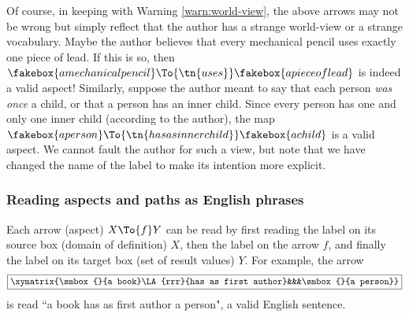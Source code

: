 Of course, in keeping with Warning \ref{warn:world-view}, the above arrows may not be wrong but simply reflect that the author has a strange world-view or a strange vocabulary. Maybe the author believes that every mechanical pencil uses exactly one piece of lead. If this is so, then $\fakebox{a mechanical pencil}\To{\tn{uses}}\fakebox{a piece of lead}$ is indeed a valid aspect!   Similarly, suppose the author meant to say that each person {\em was once} a child, or that a person has an inner child. Since every person has one and only one inner child (according to the author), the map $\fakebox{a person}\To{\tn{has as inner child}}\fakebox{a child}$ is a valid aspect. We cannot fault the author for such a view, but note that we have changed the name of the label to make its intention more explicit.

\subsubsection{Reading aspects and paths as English phrases}

Each arrow (aspect) $X\To{f} Y$ can be read by first reading the label on its source box (domain of definition) $X$, then the label on the arrow $f$, and finally the label on its target box (set of result values) $Y$. For example, the arrow \begin{align}\label{dia:first author}\fbox{\xymatrix{\smbox{}{a book}\LA{rrr}{has as first author}&&&\smbox{}{a person}}}\end{align} is read ``a book has as first author a person", a valid English sentence.


